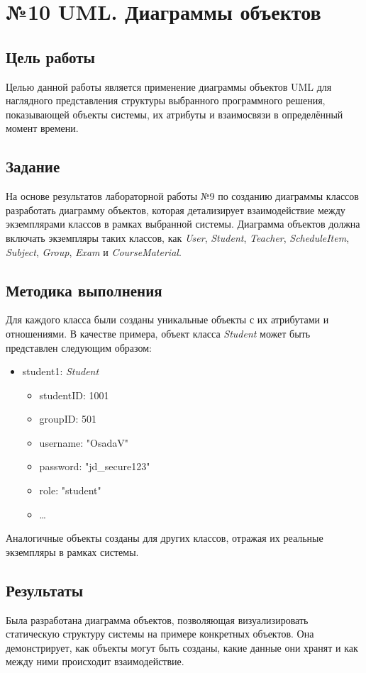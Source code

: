 \documentclass[a4paper,12pt]{article}
\begin{document}
\section{№10 UML. Диаграммы объектов}

\subsection{Цель работы}
Целью данной работы является применение диаграммы объектов UML для наглядного представления структуры выбранного программного решения, показывающей объекты системы, их атрибуты и взаимосвязи в определённый момент времени.

\subsection{Задание}
На основе результатов лабораторной работы №9 по созданию диаграммы классов разработать диаграмму объектов, которая детализирует взаимодействие между экземплярами классов в рамках выбранной системы. Диаграмма объектов должна включать экземпляры таких классов, как \textit{User}, \textit{Student}, \textit{Teacher}, \textit{ScheduleItem}, \textit{Subject}, \textit{Group}, \textit{Exam} и \textit{CourseMaterial}.

\subsection{Методика выполнения}
Для каждого класса были созданы уникальные объекты с их атрибутами и отношениями. В качестве примера, объект класса \textit{Student} может быть представлен следующим образом:
\begin{itemize}
    \item student1: \textit{Student}
    \begin{itemize}
        \item studentID: 1001
        \item groupID: 501
        \item username: "OsadaV"
        \item password: "jd\_secure123"
        \item role: "student"
        \item \ldots
    \end{itemize}
\end{itemize}
Аналогичные объекты созданы для других классов, отражая их реальные экземпляры в рамках системы.

\subsection{Результаты}
Была разработана диаграмма объектов, позволяющая визуализировать статическую структуру системы на примере конкретных объектов. Она демонстрирует, как объекты могут быть созданы, какие данные они хранят и как между ними происходит взаимодействие.
\end{document}
